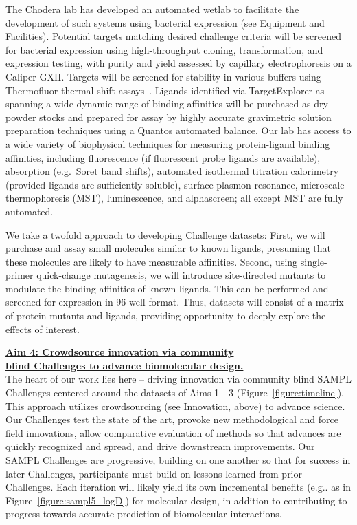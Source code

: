 \documentclass[11pt]{article}
\begin{document}
The Chodera lab has developed an automated wetlab to facilitate the development of such systems using bacterial expression (see Equipment and Facilities).
Potential targets matching desired challenge criteria will be screened for bacterial expression using high-throughput cloning, transformation, and expression testing, with purity and yield assessed by capillary electrophoresis on a Caliper GXII.
Targets will be screened for stability in various buffers using Thermofluor thermal shift assays~\cite{Reinhard:2013:ActaCrystallographicaSectionFStructuralBiologyandCrystallizationCommunications}.
Ligands identified via TargetExplorer as spanning a wide dynamic range of binding affinities will be purchased as dry powder stocks and prepared for assay by highly accurate gravimetric solution preparation techniques using a Quantos automated balance.
Our lab has access to a wide variety of biophysical techniques for measuring protein-ligand binding affinities, including fluorescence (if fluorescent probe ligands are available), absorption (e.g.~Soret band shifts), automated isothermal titration calorimetry (provided ligands are sufficiently soluble), surface plasmon resonance, microscale thermophoresis (MST), luminescence, and alphascreen; all except MST are fully automated. 

We take a twofold approach to developing Challenge datasets:
First, we will purchase and assay small molecules similar to known ligands, presuming that these molecules are likely to have measurable affinities.
Second, using single-primer quick-change mutagenesis, we will introduce site-directed mutants to modulate the binding affinities of known ligands.
This can be performed and screened for expression in 96-well format.
Thus, datasets will consist of a matrix of protein mutants and ligands, providing opportunity to deeply explore the effects of interest.

\textbf{\underline{Aim 4: Crowdsource innovation via community}}\\
\textbf{\underline{blind Challenges to advance biomolecular design.}}\\
The heart of our work lies here -- driving innovation via community blind SAMPL Challenges centered around the datasets of Aims 1---3 (Figure~\ref{figure:timeline}).
This approach utilizes crowdsourcing (see Innovation, above) to advance science.
Our Challenges test the state of the art, provoke new methodological and force field innovations, allow comparative evaluation of methods so that advances are quickly recognized and spread, and drive downstream improvements.
Our SAMPL Challenges are progressive, building on one another so that for success in later Challenges, participants must build on lessons learned from prior Challenges.
Each iteration will likely yield its own incremental benefits (e.g.. as in Figure~\ref{figure:sampl5_logD}) for molecular design, in addition to contributing to progress towards accurate prediction of biomolecular interactions.
\end{document}
